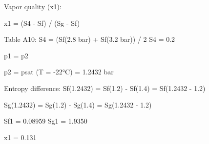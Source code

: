 Vapor quality (x1):  

x1 = (S4 - Sf) / (Sg - Sf)  

Table A10:  
S4 = (Sf(2.8 bar) + Sf(3.2 bar)) / 2  
S4 = 0.2  

p1 = p2  

p2 = psat (T = -22°C) = 1.2432 bar  

Entropy difference:  
Sf(1.2432) = Sf(1.2) - Sf(1.4)  
= Sf(1.2432 - 1.2)  

Sg(1.2432) = Sg(1.2) - Sg(1.4)  
= Sg(1.2432 - 1.2)  

Sf1 = 0.08959  
Sg1 = 1.9350  

x1 = 0.131